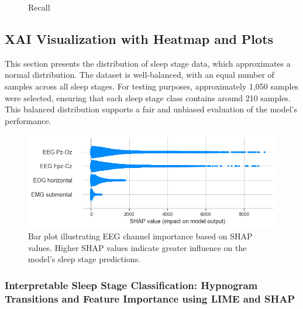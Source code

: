 \begin{figure}[htbp]
\begin{minipage}[b]{0.31\linewidth}
		\caption{Recall}
		\label{fig:recallplot}
	\end{minipage}
\end{figure}















\subsection{XAI Visualization with Heatmap and Plots}





This section presents the distribution of sleep stage data, which approximates a normal distribution. The dataset is well-balanced, with an equal number of samples across all sleep stages. For testing purposes, approximately 1,050 samples were selected, ensuring that each sleep stage class contains around 210 samples. This balanced distribution supports a fair and unbiased evaluation of the model's performance.





\begin{figure}[H]
	\centering
	\includegraphics[width=0.7\linewidth]{"img/paper_3/shap important"}
	\caption{Bar plot illustrating EEG channel importance based on SHAP values. Higher SHAP values indicate greater influence on the model's sleep stage predictions.}
	
	\label{fig:shap-important}
\end{figure}




\subsubsection*{Interpretable Sleep Stage Classification: Hypnogram Transitions and Feature Importance using LIME and SHAP}

